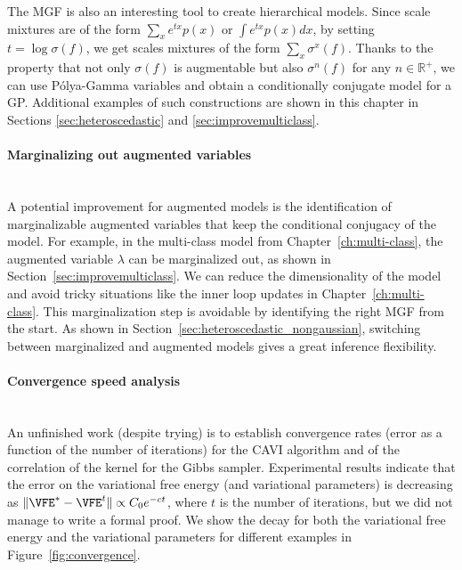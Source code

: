 The \ac{MGF} is also an interesting tool to create hierarchical models. 
Since scale mixtures are of the form $\sum_{x} e^{tx} p(x)$ or $\int e^{tx}p(x)dx$, by setting $t=\log \sigma(f)$, we get scales mixtures of the form $\sum_x \sigma^x(f)$.
Thanks to the property that not only $\sigma(f)$ is augmentable but also $\sigma^n(f)$ for any $n\in \mathbb{R}^+$, we can use P\'olya-Gamma variables and obtain a conditionally conjugate model for a \ac{GP}.
Additional examples of such constructions are shown in this chapter in Sections \ref{sec:heteroscedastic} and \ref{sec:improvemulticlass}.

\paragraph{Marginalizing out augmented variables}\mbox{}\\
A potential improvement for augmented models is the identification of marginalizable augmented variables that keep the conditional conjugacy of the model.
For example, in the multi-class model from Chapter~\ref{ch:multi-class}, the augmented variable $\lambda$ can be marginalized out, as shown in Section~\ref{sec:improvemulticlass}.
We can reduce the dimensionality of the model and avoid tricky situations like the inner loop updates in Chapter~\ref{ch:multi-class}.
This marginalization step is avoidable by identifying the right \ac{MGF} from the start.
As shown in Section~\ref{sec:heteroscedastic_nongaussian}, switching between marginalized and augmented models gives a great inference flexibility.

\paragraph{Convergence speed analysis}\mbox{}\\
An unfinished work (despite trying) is to establish convergence rates (error as a function of the number of iterations) for the \ac{CAVI} algorithm and of the correlation of the kernel for the Gibbs sampler.
Experimental results indicate that the error on the variational free energy (and variational parameters) is decreasing as $\|\VFE^{*} - \VFE^{t}\|\propto C_0 e^{-ct}$, where $t$ is the number of iterations, but we did not manage to write a formal proof.
We show the decay for both the variational free energy and the variational parameters for different examples in Figure~\ref{fig:convergence}.

